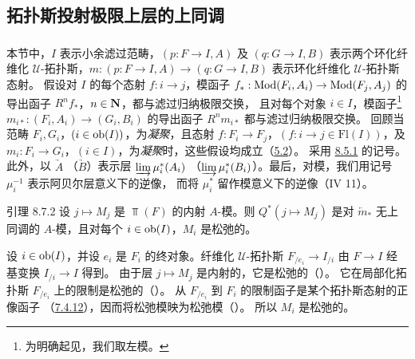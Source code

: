 

\subsection{拓扑斯投射极限上层的上同调}

\subsubsection{}

本节中，$I$ 表示小余滤过范畴，$(p:F\to I,A)$ 及 $(q:G\to I,B)$ 表示两个环化纤维化
$𝒰$-拓扑斯，$m:(p:F\to I,A)\to(q:G\to I,B)$ 表示环化纤维化 $𝒰$-拓扑斯态射。
假设对 $I$ 的每个态射 $f:i\to j$，模函子
$f_{\ast}:\Mod(F_i,A_i)\to\Mod(F_j,A_j)$ 的导出函子 $R^nf_{\ast}$，$n\in\mathbf{N}$，都与滤过归纳极限交换，
且对每个对象 $i\in I$，模函子\footnote{为明确起见，我们取左模。}
$m_{i\ast}:(F_i,A_i)\to(G_i,B_i)$ 的导出函子 $R^nm_{i\ast}$ 都与滤过归纳极限交换。
回顾当范畴 $F_i,G_i$，$(i\in\operatorname{ob}(I))$，为\emph{凝聚}，且态射
$f:F_i\to F_j$，$(f:i\to j\in \text{Fl}(I))$，及
$m_i:F_i\to G_i$，$(i\in I)$，为\emph{凝聚}时，这些假设均成立（\hyperref[VI.cor5.2]{5.2}）。
采用 \hyperref[VI.subsubsec8.5.1]{8.5.1} 的记号。此外，以 $\underrightarrow{A}$
（\resp $\underrightarrow{B}$）表示层 $\varinjlim\mu^{\ast}_i(A_i)$
（\resp $\varinjlim\mu^{\ast}_i(B_i)$）。最后，对模，我们用记号 $\mu^{-1}_i$ 表示阿贝尔层意义下的逆像，
而将 $\mu_i^{\ast}$ 留作模意义下的逆像（IV 11）。

\begin{enonce*}{引理 8.7.2}
设\pageoriginale{} $j\mapsto M_j$ 是 $\Top(F)$ 的内射 $A$-模。则
$Q^{\ast}(j\mapsto M_j)$ 是对 $\underleftarrow{m}_{\ast}$ 无上同调的 $A$-模，且对每个
$i\in\operatorname{ob}(I)$，$M_i$ 是松弛的。
\end{enonce*}

设 $i\in\operatorname{ob}(I)$，并设 $e_i$ 是 $F_i$ 的终对象。纤维化 $𝒰$-拓扑斯
$F_{/e_i}\to I_{/i}$ 由 $F\to I$ 经基变换 $I_{/i}\to I$ 得到。
由于层 $j\mapsto M_j$ 是内射的，它是松弛的（）。
它在局部化拓扑斯 $F_{/e_i}$ 上的限制是松弛的（）。
从 $F_{/e_i}$ 到 $F_i$ 的限制函子是某个拓扑斯态射的正像函子
（\hyperref[VI.lem7.4.12]{7.4.12}），因而将松弛模映为松弛模（）。
所以 $M_i$ 是松弛的。

